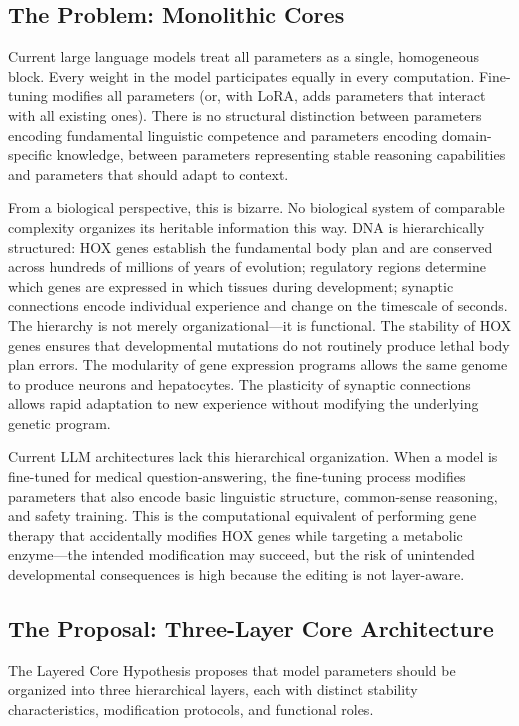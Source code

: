 \documentclass[11pt]{article}
\begin{document}
\subsection{The Problem: Monolithic Cores}

Current large language models treat all parameters as a single, homogeneous block. Every weight in the model participates equally in every computation. Fine-tuning modifies all parameters (or, with LoRA, adds parameters that interact with all existing ones). There is no structural distinction between parameters encoding fundamental linguistic competence and parameters encoding domain-specific knowledge, between parameters representing stable reasoning capabilities and parameters that should adapt to context.

From a biological perspective, this is bizarre. No biological system of comparable complexity organizes its heritable information this way. DNA is hierarchically structured: HOX genes establish the fundamental body plan and are conserved across hundreds of millions of years of evolution; regulatory regions determine which genes are expressed in which tissues during development; synaptic connections encode individual experience and change on the timescale of seconds. The hierarchy is not merely organizational---it is functional. The stability of HOX genes ensures that developmental mutations do not routinely produce lethal body plan errors. The modularity of gene expression programs allows the same genome to produce neurons and hepatocytes. The plasticity of synaptic connections allows rapid adaptation to new experience without modifying the underlying genetic program.

Current LLM architectures lack this hierarchical organization. When a model is fine-tuned for medical question-answering, the fine-tuning process modifies parameters that also encode basic linguistic structure, common-sense reasoning, and safety training. This is the computational equivalent of performing gene therapy that accidentally modifies HOX genes while targeting a metabolic enzyme---the intended modification may succeed, but the risk of unintended developmental consequences is high because the editing is not layer-aware.

\subsection{The Proposal: Three-Layer Core Architecture}

The Layered Core Hypothesis proposes that model parameters should be organized into three hierarchical layers, each with distinct stability characteristics, modification protocols, and functional roles.
\end{document}
